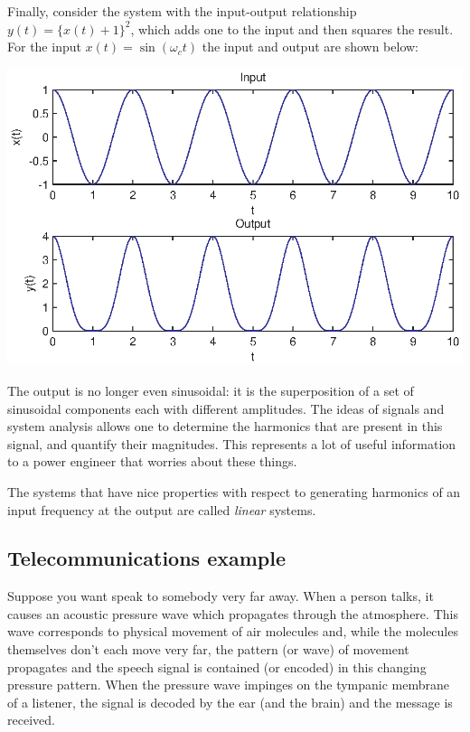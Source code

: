 \documentclass[10pt]{beamer}
\begin{document}
Finally, consider the system with the input-output relationship $y(t) = \{x(t) + 1\}^2$, which adds one to the input and then squares the result.  For the input $x(t) = \sin(\omega_c t)$ the input and output are shown below:
\begin{center}
  \includegraphics{ee_example}
\end{center}
The output is no longer even sinusoidal:  it is the superposition of a set of sinusoidal components each with different amplitudes.  The ideas of signals and system analysis allows one to determine the harmonics that are present in this signal, and quantify their magnitudes.  This represents a lot of useful information to a power engineer that worries about these things.

The systems that have nice properties with respect to generating harmonics of an input frequency at the output are called {\em linear} systems.

\subsection{Telecommunications example}

Suppose you want speak to somebody very far away.  When a person talks, it causes an acoustic pressure wave which propagates through the atmosphere.  This wave corresponds to physical movement of air molecules and, while the molecules themselves don't each move very far, the pattern (or wave) of movement propagates and the speech signal is contained (or encoded) in this changing pressure pattern.  When the pressure wave impinges on the tympanic membrane of a listener, the signal is decoded by the ear (and the brain) and the message is received.
\end{document}
